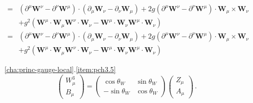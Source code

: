 \begin{itemize}
\begin{align}
    =&(\partial^\mu \mathbf{W}^\nu -\partial^\nu \mathbf{W}^\mu)\cdot(\partial_\mu \mathbf{W}_\nu -\partial_\nu \mathbf{W}_\mu)
    +2g(\partial^\mu \mathbf{W}^\nu -\partial^\nu \mathbf{W}^\mu)\cdot \mathbf{W}_\mu\times\mathbf{W}_\nu\nonumber\\
    &+g^2(\mathbf{W}^\mu\cdot\mathbf{W}_\mu \mathbf{W}^\nu\cdot\mathbf{W}_\nu-\mathbf{W}^\mu\cdot\mathbf{W}_\nu  \mathbf{W}^\mu \cdot\mathbf{W}_\nu)\nonumber\\
    =&(\partial^\mu \mathbf{W}^\nu -\partial^\nu \mathbf{W}^\mu)\cdot(\partial_\mu \mathbf{W}_\nu -\partial_\nu \mathbf{W}_\mu)
    +2g(\partial^\mu \mathbf{W}^\nu -\partial^\nu \mathbf{W}^\mu)\cdot \mathbf{W}_\mu\times\mathbf{W}_\nu\nonumber\\
    &+g^2(\mathbf{W}^\mu\cdot\mathbf{W}_\mu \mathbf{W}^\nu\cdot\mathbf{W}_\nu-\mathbf{W}^\mu\cdot\mathbf{W}_\nu  \mathbf{W}^\mu \cdot\mathbf{W}_\nu)
\end{align} 

\item[\ref{cha:princ-gauge-local}.\ref{item:pch3.5}]
\begin{equation*}
  \begin{pmatrix}
    W^3_\mu\\
    B_\mu
  \end{pmatrix}=
  \begin{pmatrix}
    \cos\theta_W&\sin\theta_W\\
    -\sin\theta_W&\cos\theta_W
  \end{pmatrix}
  \begin{pmatrix}
    Z_\mu\\
    A_\mu
  \end{pmatrix}\,.
\end{equation*}


\end{itemize}
